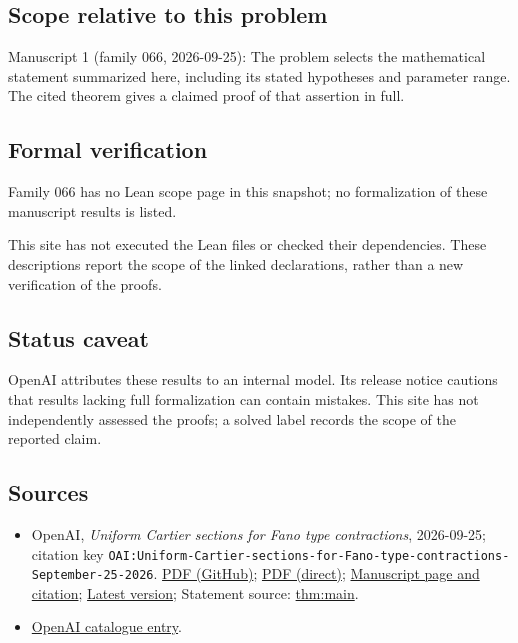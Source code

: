 \documentclass[11pt]{article}
\begin{document}
\subsection{Scope relative to this problem}
Manuscript 1 (family 066, 2026-09-25): The problem selects the mathematical statement summarized here, including its stated hypotheses and parameter range. The cited theorem gives a claimed proof of that assertion in full.

\subsection{Formal verification}
Family 066 has no Lean scope page in this snapshot; no formalization of these manuscript results is listed.

This site has not executed the Lean files or checked their dependencies. These descriptions report the scope of the linked declarations, rather than a new verification of the proofs.

\subsection{Status caveat}
OpenAI attributes these results to an internal model. Its release notice cautions that results lacking full formalization can contain mistakes. This site has not independently assessed the proofs; a solved label records the scope of the reported claim.

\subsection{Sources}
\begin{itemize}
\item OpenAI, \emph{Uniform Cartier sections for Fano type contractions}, 2026-09-25; citation key \texttt{OAI:Uniform-Cartier-sections-for-Fano-type-contractions-September-25-2026}. \href{https://github.com/openai/math/blob/adc7f1241b42e322a6451854ab7e4b4c146bf78a/preprints/Uniform-Cartier-sections-for-Fano-type-contractions-September-25-2026/Uniform-Cartier-sections-for-Fano-type-contractions-September-25-2026.pdf}{PDF (GitHub)}; \href{https://github.com/openai/math/raw/adc7f1241b42e322a6451854ab7e4b4c146bf78a/preprints/Uniform-Cartier-sections-for-Fano-type-contractions-September-25-2026/Uniform-Cartier-sections-for-Fano-type-contractions-September-25-2026.pdf}{PDF (direct)}; \href{https://github.com/openai/math/blob/adc7f1241b42e322a6451854ab7e4b4c146bf78a/preprints/Uniform-Cartier-sections-for-Fano-type-contractions-September-25-2026/README.md}{Manuscript page and citation}; \href{https://github.com/openai/math/blob/main/preprints/Uniform-Cartier-sections-for-Fano-type-contractions-September-25-2026/Uniform-Cartier-sections-for-Fano-type-contractions-September-25-2026.pdf}{Latest version}; Statement source: \href{https://github.com/openai/math/blob/adc7f1241b42e322a6451854ab7e4b4c146bf78a/preprints/Uniform-Cartier-sections-for-Fano-type-contractions-September-25-2026/build/sections/introduction.tex\#L21}{thm:main}.
\item \href{https://github.com/openai/math/blob/adc7f1241b42e322a6451854ab7e4b4c146bf78a/CONTENTS.md}{OpenAI catalogue entry}.
\end{itemize}
\end{document}
